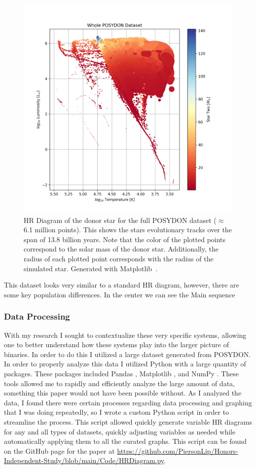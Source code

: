 \documentclass[12pt, a4paper]{article}
\begin{document}
        \begin{figure}[H]
            \centering
            \includegraphics[width = .7\textwidth]{figs/GeneratedFigs/WholePOSYDONDatasetExample.png}
            \caption{HR Diagram of the donor star for the full POSYDON dataset ($\approx$6.1 million points). This shows the stars evolutionary tracks over the span of 13.8 billion years. Note that the color of the plotted points correspond to the solar mass of the donor star. Additionally, the radius of each plotted point corresponds with the radius of the simulated star. Generated with Matplotlib~\parencite{Matplotlib}.}
            \label{EntireDataSetHR}
        \end{figure}


        This dataset looks very similar to a standard HR diagram, however, there are some key population differences. In the center we can see the Main sequence
        \subsubsection{Data Processing}
            With my research I sought to contextualize these very specific systems, allowing one to better understand how these systems play into the larger picture of binaries. In order to do this I utilized a large dataset generated from POSYDON. In order to properly analyze this data I utilized Python with a large quantity of packages. These packages included Pandas \parencite{reback2020pandas}, Matplotlib \parencite{Matplotlib}, and NumPy \parencite{harris2020array}. These tools allowed me to rapidly and efficiently analyze the large amount of data, something this paper would not have been possible without.  As I analyzed the data, I found there were certain processes regarding data processing and graphing that I was doing repeatedly, so I wrote a custom Python script in order to streamline the process. This script allowed quickly generate variable HR diagrams for any and all types of datasets, quickly adjusting variables as needed while automatically applying them to all the curated graphs. This script can be found on the GitHub page for the paper at \url{https://github.com/PiersonLip/Honors-Independent-Study/blob/main/Code/HRDiagram.py}.
\end{document}
